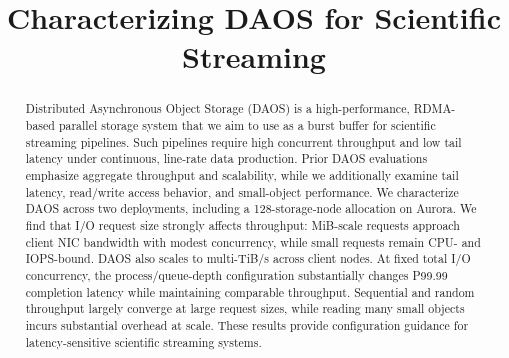 \documentclass[conference]{IEEEtran}
\begin{document}
\title{Characterizing DAOS for Scientific Streaming}


\author{
\and
{}
}




\maketitle

\begin{abstract}
Distributed Asynchronous Object Storage (DAOS) is a high-performance, RDMA-based parallel storage system that we aim to use as a burst buffer for scientific streaming pipelines. Such pipelines require high concurrent throughput and low tail latency under continuous, line-rate data production. Prior DAOS evaluations emphasize aggregate throughput and scalability, while we additionally examine tail latency, read/write access behavior, and small-object performance. We characterize DAOS across two deployments, including a 128-storage-node allocation on Aurora. We find that I/O request size strongly affects throughput: MiB-scale requests approach client NIC bandwidth with modest concurrency, while small requests remain CPU- and IOPS-bound. DAOS also scales to multi-TiB/s across client nodes. At fixed total I/O concurrency, the process/queue-depth configuration substantially changes P99.99 completion latency while maintaining comparable throughput. Sequential and random throughput largely converge at large request sizes, while reading many small objects incurs substantial overhead at scale. These results provide configuration guidance for latency-sensitive scientific streaming systems.
\end{abstract}
\end{document}
